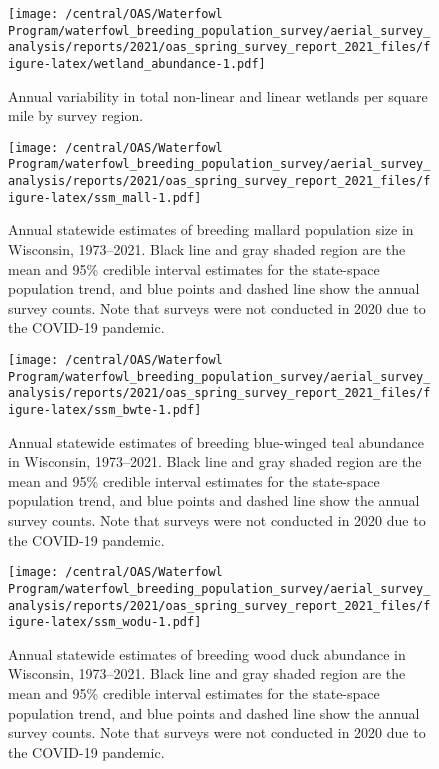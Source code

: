 \documentclass[
  12pt,
]{article}
\begin{document}
\newpage

\begin{figure}
\centering
\texttt{[image: /central/OAS/Waterfowl Program/waterfowl\_breeding\_population\_survey/aerial\_survey\_analysis/reports/2021/oas\_spring\_survey\_report\_2021\_files/figure-latex/wetland\_abundance-1.pdf]}
\caption{\label{fig:wetland_abundance}Annual variability in total
non-linear and linear wetlands per square mile by survey region.}
\end{figure}

\newpage

\begin{figure}
\centering
\texttt{[image: /central/OAS/Waterfowl Program/waterfowl\_breeding\_population\_survey/aerial\_survey\_analysis/reports/2021/oas\_spring\_survey\_report\_2021\_files/figure-latex/ssm\_mall-1.pdf]}
\caption{\label{fig:ssm_mall}Annual statewide estimates of breeding
mallard population size in Wisconsin, 1973--2021. Black line and gray
shaded region are the mean and 95\% credible interval estimates for the
state-space population trend, and blue points and dashed line show the
annual survey counts. Note that surveys were not conducted in 2020 due
to the COVID-19 pandemic.}
\end{figure}

\newpage

\begin{figure}
\centering
\texttt{[image: /central/OAS/Waterfowl Program/waterfowl\_breeding\_population\_survey/aerial\_survey\_analysis/reports/2021/oas\_spring\_survey\_report\_2021\_files/figure-latex/ssm\_bwte-1.pdf]}
\caption{\label{fig:ssm_bwte}Annual statewide estimates of breeding
blue-winged teal abundance in Wisconsin, 1973--2021. Black line and gray
shaded region are the mean and 95\% credible interval estimates for the
state-space population trend, and blue points and dashed line show the
annual survey counts. Note that surveys were not conducted in 2020 due
to the COVID-19 pandemic.}
\end{figure}

\newpage

\begin{figure}
\centering
\texttt{[image: /central/OAS/Waterfowl Program/waterfowl\_breeding\_population\_survey/aerial\_survey\_analysis/reports/2021/oas\_spring\_survey\_report\_2021\_files/figure-latex/ssm\_wodu-1.pdf]}
\caption{\label{fig:ssm_wodu}Annual statewide estimates of breeding wood
duck abundance in Wisconsin, 1973--2021. Black line and gray shaded
region are the mean and 95\% credible interval estimates for the
state-space population trend, and blue points and dashed line show the
annual survey counts. Note that surveys were not conducted in 2020 due
to the COVID-19 pandemic.}
\end{figure}
\end{document}
